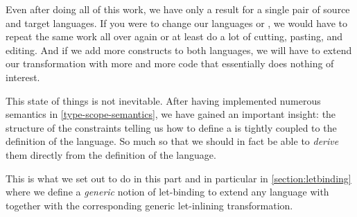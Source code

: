 Even after doing all of this work, we have only a result for a single pair of
source and target languages. If you were to change our languages  or
, we would have to repeat the same work all over again or at least do a
lot of cutting, pasting, and editing. And if we add more constructs to both
languages, we will have to extend our transformation with more and more code
that essentially does nothing of interest.

This state of things is not inevitable. After having implemented numerous
semantics in \cref{type-scope-semantics}, we have gained an important insight:
the structure of the constraints telling us how to define a  is
tightly coupled to the definition of the language. So much so that we should
in fact be able to \emph{derive} them directly from the definition of the
language.

This is what we set out to do in this part and in particular in
\cref{section:letbinding} where we define a \emph{generic} notion of
let-binding to extend any language with together with the corresponding
generic let-inlining transformation.
